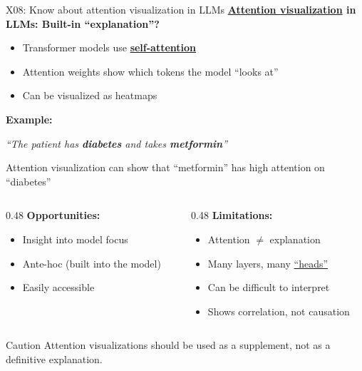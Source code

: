 \documentclass[aspectratio=169, 10pt]{beamer}
\begin{document}
\begin{frame}{X08: Know about attention visualization in LLMs}
    \textbf{\href{https://jalammar.github.io/illustrated-transformer/}{Attention visualization} in LLMs: Built-in ``explanation''?}
    \vspace{-0.1cm}
    \begin{itemize}
        \item Transformer models use \textbf{\href{https://en.wikipedia.org/wiki/Attention_(machine_learning)}{self-attention}}
        \item Attention weights show which tokens the model ``looks at''
        \item Can be visualized as heatmaps
    \end{itemize}
    
    \vspace{0.1cm}
    \textbf{Example:}
    \begin{center}
        \textit{``The patient has \textbf{diabetes} and takes \textbf{metformin}''}
    \end{center}
    Attention visualization can show that ``metformin'' has high attention on ``diabetes''
    
    \vspace{0.1cm}
    \begin{columns}[T]
        \begin{column}{0.48\textwidth}
            \textbf{Opportunities:}
            \begin{itemize}
                \item Insight into model focus
                \item Ante-hoc (built into the model)
                \item Easily accessible
            \end{itemize}
        \end{column}
        \begin{column}{0.48\textwidth}
            \textbf{Limitations:}
            \begin{itemize}
                \item Attention $\neq$ explanation
                \item Many layers, many \href{https://en.wikipedia.org/wiki/Transformer_(deep_learning_architecture)}{``heads''}
                \item Can be difficult to interpret
                \item Shows correlation, not causation
            \end{itemize}
        \end{column}
    \end{columns}
    
    {\footnotesize
    \begin{alertblock}{Caution}
        Attention visualizations should be used as a supplement, not as a definitive explanation.
    \end{alertblock}
    }
\end{frame}
\end{document}
